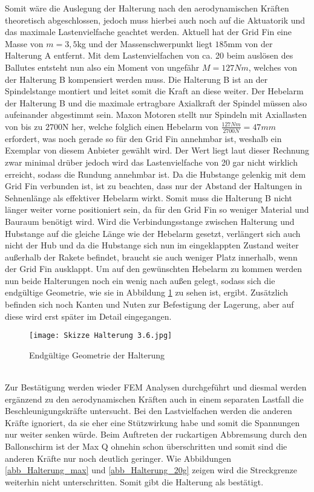 Somit wäre die Auslegung der Halterung nach den aerodynamischen Kräften theoretisch abgeschlossen, jedoch muss hierbei auch noch auf die Aktuatorik und das maximale Lastenvielfache geachtet werden. Aktuell hat der Grid Fin eine Masse von $m = 3,5$kg und der Massenschwerpunkt liegt $185$mm von der Halterung A entfernt. Mit dem Lastenvielfachen von ca. 20 beim auslösen des Ballutes entsteht nun also ein Moment von ungefähr $M=127Nm$, welches von der Halterung B kompensiert werden muss. Die Halterung B ist an der Spindelstange montiert und leitet somit die Kraft an diese weiter. Der Hebelarm der Halterung B und die maximale ertragbare Axialkraft der Spindel müssen also aufeinander abgestimmt sein. Maxon Motoren stellt nur Spindeln mit Axiallasten von bis zu $2700$N her, welche folglich einen Hebelarm von $\frac{127Nm}{2700N}=47mm$ erfordert, was noch gerade so für den Grid Fin annehmbar ist, weshalb ein Exemplar von diesem Anbieter gewählt wird. Der Wert liegt laut dieser Rechnung zwar minimal drüber jedoch wird das Lastenvielfache von 20 gar nicht wirklich erreicht, sodass die Rundung annehmbar ist. Da die Hubstange gelenkig mit dem Grid Fin verbunden ist, ist zu beachten, dass nur der Abstand der Haltungen in Sehnenlänge als effektiver Hebelarm wirkt. Somit muss die Halterung B nicht länger weiter vorne positioniert sein, da für den Grid Fin so weniger Material und Bauraum benötigt wird. Wird die Verbindungsstange zwischen Halterung und Hubstange auf die gleiche Länge wie der Hebelarm gesetzt, verlängert sich auch nicht der Hub und da die Hubstange sich nun im eingeklappten Zustand weiter außerhalb der Rakete befindet, braucht sie auch weniger Platz innerhalb, wenn der Grid Fin ausklappt. Um auf den gewünschten Hebelarm zu kommen werden nun beide Halterungen noch ein wenig nach außen gelegt, sodass sich die endgültige Geometrie, wie sie in Abbildung \ref{abb_Halterung-fertig} zu sehen ist, ergibt. Zusätzlich befinden sich noch Kanten und Nuten zur Befestigung der Lagerung, aber auf diese wird erst später im Detail eingegangen.
\begin{figure}[h] 
	\centering
	\texttt{[image: Skizze Halterung 3.6.jpg]}
	\caption{Endgültige Geometrie der Halterung}
	\label{abb_Halterung-fertig}
\end{figure}\\
Zur Bestätigung werden wieder FEM Analysen durchgeführt und diesmal werden ergänzend zu den aerodynamischen Kräften auch in einem separaten Lastfall die Beschleunigungskräfte untersucht. Bei den Lastvielfachen werden die anderen Kräfte ignoriert, da sie eher eine Stützwirkung habe und somit die Spannungen nur weiter senken würde. Beim Auftreten der ruckartigen Abbremsung durch den Ballonschirm ist der Max Q ohnehin schon überschritten und somit sind die anderen Kräfte nur noch deutlich geringer. Wie Abbildungen \ref{abb_Halterung_max} und \ref{abb_Halterung_20g} zeigen wird die Streckgrenze weiterhin nicht unterschritten. Somit gibt die Halterung als bestätigt.
